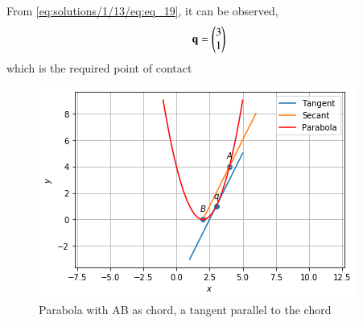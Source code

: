 From \eqref{eq:solutions/1/13/eq:eq_19}, it can be observed,
\begin{align}
    \mathbf{q} = \begin{pmatrix}3 \\ 1\end{pmatrix}
\end{align}
which is the required point of contact
\begin{figure}[ht!]
    \centering
    \includegraphics[width=\columnwidth]{./solutions/conics/1/13/Assignment_7_Plot.png}
    \caption{Parabola with AB as chord, a tangent parallel to the chord}
    \label{eq:solutions/1/13/Fig:1}
\end{figure} 
